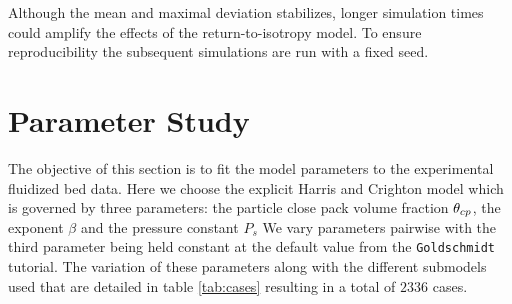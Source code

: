 Although the mean and maximal deviation stabilizes, longer simulation times could amplify the effects of the return-to-isotropy model.
To ensure reproducibility the subsequent simulations are run with a fixed seed.





\section{Parameter Study}
\label{sec:paramStudy}

The objective of this section is to fit the \MP model parameters to the experimental fluidized bed data.
Here we choose the explicit Harris and Crighton model which is governed by three parameters: the particle close pack volume fraction $\theta_{cp}$, the exponent $\beta$ and the pressure constant $P_s$
We vary parameters pairwise with the third parameter being held constant at the default value from the \lstinline|Goldschmidt| tutorial.
The variation of these parameters along with the different submodels used that are detailed in table \ref{tab:cases} resulting in a total of $2336$ cases.



